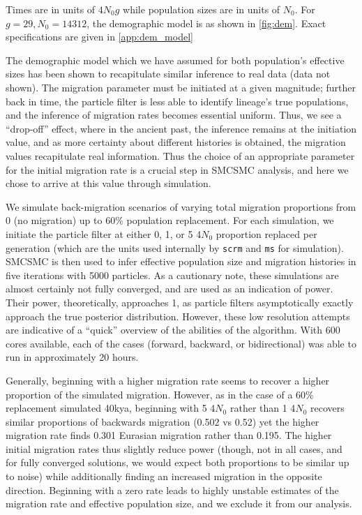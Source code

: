 Times are in units of $4N_0g$ while population sizes are in units of $N_0$. For $g=29, N_0 = 14312$, the demographic model is as shown in \autoref{fig:dem}.  Exact specifications are given in \ref{app:dem_model}

The demographic model which we have assumed for both population's effective sizes has been shown to recapitulate similar inference to real data (data not shown). The migration parameter must be initiated at a given magnitude; further back in time, the particle filter is less able to identify lineage's true populations, and the inference of migration rates becomes essential uniform. Thus, we see a ``drop-off'' effect, where in the ancient past, the inference remains at the initiation value, and as more certainty about different histories is obtained, the migration values recapitulate real information. Thus the choice of an appropriate parameter for the initial migration rate is a crucial step in SMCSMC analysis, and here we chose to arrive at this value through simulation.

We simulate back-migration scenarios of varying total migration proportions from 0 (no migration) up to 60\% population replacement. For each simulation, we initiate the particle filter at either 0, 1, or 5 4$N_0$ proportion replaced per generation (which are the units used internally by {\tt scrm} and {\tt ms} for simulation).  SMCSMC is then used to infer effective population size and migration histories in five iterations with 5000 particles. As a cautionary note, these simulations are almost certainly not fully converged, and are used as an indication of power. Their power, theoretically, approaches 1, as particle filters asymptotically exactly approach the true posterior distribution. However, these low resolution attempts are indicative of a ``quick'' overview of the abilities of the algorithm. With 600 cores available, each of the cases (forward, backward, or bidirectional) was able to run in approximately 20 hours. 

Generally, beginning with a higher migration rate seems to recover a higher proportion of the simulated migration. However, as in the case of a 60\% replacement simulated 40kya, beginning with 5 4$N_0$ rather than 1 4$N_0$ recovers similar proportions of backwards migration (0.502 vs 0.52) yet the higher migration rate finds 0.301 Eurasian migration rather than 0.195. The higher initial migration rates thus slightly reduce power (though, not in all cases, and for fully converged solutions, we would expect both proportions to be similar up to noise) while additionally finding an increased migration in the opposite direction.  Beginning with a zero rate leads to highly unstable estimates of the migration rate and effective population size, and we exclude it from our analysis.




